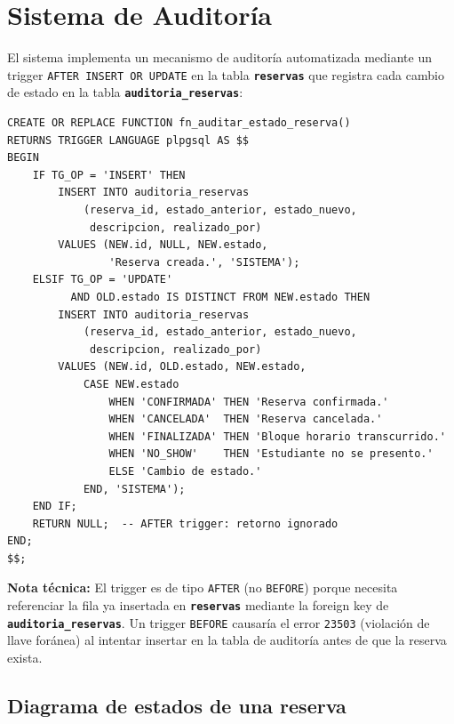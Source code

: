 \documentclass[12pt, a4paper]{article}
\newcommand{\tname}[1]{\texttt{\textbf{#1}}}
\begin{document}
\section{Sistema de Auditoría}

El sistema implementa un mecanismo de auditoría automatizada mediante un trigger \texttt{AFTER INSERT OR UPDATE} en la tabla \tname{reservas} que registra cada cambio de estado en la tabla \tname{auditoria\_reservas}:

\begin{lstlisting}[caption={Trigger de auditoría (AFTER --- ejecuta después de confirmar la fila).}]
CREATE OR REPLACE FUNCTION fn_auditar_estado_reserva()
RETURNS TRIGGER LANGUAGE plpgsql AS $$
BEGIN
    IF TG_OP = 'INSERT' THEN
        INSERT INTO auditoria_reservas
            (reserva_id, estado_anterior, estado_nuevo,
             descripcion, realizado_por)
        VALUES (NEW.id, NULL, NEW.estado,
                'Reserva creada.', 'SISTEMA');
    ELSIF TG_OP = 'UPDATE'
          AND OLD.estado IS DISTINCT FROM NEW.estado THEN
        INSERT INTO auditoria_reservas
            (reserva_id, estado_anterior, estado_nuevo,
             descripcion, realizado_por)
        VALUES (NEW.id, OLD.estado, NEW.estado,
            CASE NEW.estado
                WHEN 'CONFIRMADA' THEN 'Reserva confirmada.'
                WHEN 'CANCELADA'  THEN 'Reserva cancelada.'
                WHEN 'FINALIZADA' THEN 'Bloque horario transcurrido.'
                WHEN 'NO_SHOW'    THEN 'Estudiante no se presento.'
                ELSE 'Cambio de estado.'
            END, 'SISTEMA');
    END IF;
    RETURN NULL;  -- AFTER trigger: retorno ignorado
END;
$$;
\end{lstlisting}

\textbf{Nota técnica:} El trigger es de tipo \texttt{AFTER} (no \texttt{BEFORE}) porque necesita referenciar la fila ya insertada en \tname{reservas} mediante la foreign key de \tname{auditoria\_reservas}. Un trigger \texttt{BEFORE} causaría el error \texttt{23503} (violación de llave foránea) al intentar insertar en la tabla de auditoría antes de que la reserva exista.

\subsection{Diagrama de estados de una reserva}
\end{document}
